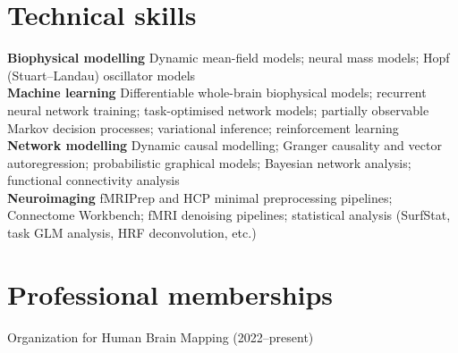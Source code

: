 \documentclass[11pt]{article}
\begin{document}
\section{Technical skills}
\textbf{Biophysical modelling} \quad Dynamic mean-field models; neural mass models; Hopf (Stuart--Landau)
oscillator models\\[2pt]
\textbf{Machine learning} \quad Differentiable whole-brain biophysical models;
recurrent neural network training; task-optimised network models; partially observable Markov decision
processes; variational inference; reinforcement learning\\[2pt]
\textbf{Network modelling} \quad Dynamic causal modelling; Granger causality and vector autoregression;
probabilistic graphical models; Bayesian network analysis; functional connectivity analysis\\[2pt]
\textbf{Neuroimaging} \quad fMRIPrep and HCP minimal preprocessing pipelines; Connectome Workbench;
fMRI denoising pipelines; statistical analysis (SurfStat, task GLM analysis, HRF deconvolution, etc.)

\section{Professional memberships}
Organization for Human Brain Mapping (2022--present)
\end{document}
